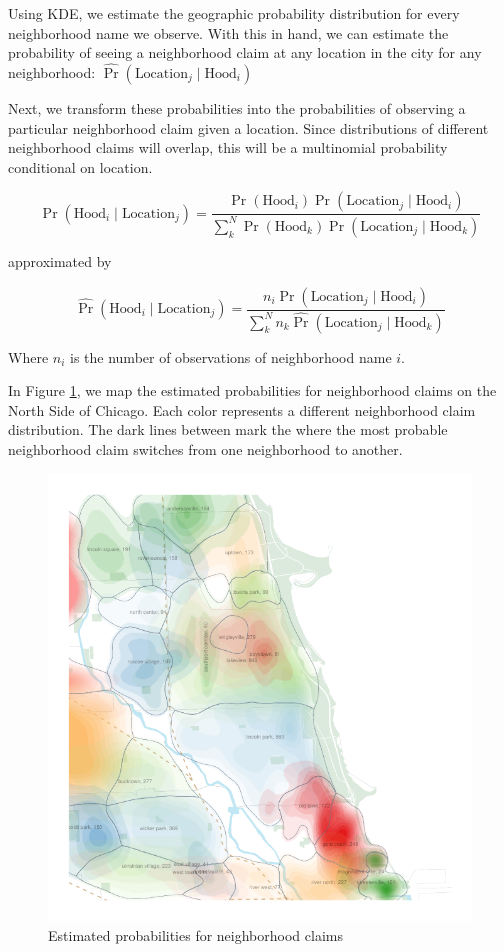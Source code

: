 \documentclass[12pt,letter]{article}\usepackage[]{graphicx}\usepackage[]{color}
\begin{document}
Using KDE, we estimate the geographic probability distribution for
every neighborhood name we observe. With this in hand, we can estimate
the probability of seeing a neighborhood claim at any location in the
city for any neighborhood: $\hat{\Pr}(\text{Location}_j \mid
\text{Hood}_i)$

Next, we transform these probabilities into the probabilities of
observing a particular neighborhood claim given a location. Since
distributions of different neighborhood claims will overlap, this will
be a multinomial probability conditional on location.

\begin{equation}
  \Pr(\text{Hood}_i \mid \text{Location}_j) = 
  \frac{\Pr(\text{Hood}_i)\Pr(\text{Location}_j \mid \text{Hood}_i)}
       {\sum_k^N \Pr(\text{Hood}_k)\Pr(\text{Location}_j \mid \text{Hood}_k)}
\end{equation}

\noindent
approximated by

\begin{equation}
  \hat{\Pr}(\text{Hood}_i \mid \text{Location}_j) = 
  \frac{n_i\hat{\Pr}(\text{Location}_j \mid \text{Hood}_i)}
       {\sum_k^N n_k\hat{\Pr}(\text{Location}_j \mid \text{Hood}_k)}
\end{equation}

\noindent 
Where $n_i$ is the number of observations of neighborhood name $i$.

In Figure \ref{fig:prob}, we map the estimated probabilities for
neighborhood claims on the North Side of Chicago. Each color
represents a different neighborhood claim distribution. The dark lines
between mark the where the most probable neighborhood claim switches
from one neighborhood to another.

\begin{figure}
  \centering
  \includegraphics{probability.pdf}
  \caption{Estimated probabilities for neighborhood claims}
\label{fig:prob}
\end{figure}
\end{document}
